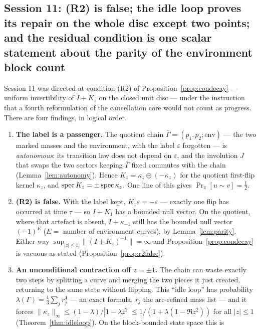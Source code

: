\subsection{Session 11: (R2) is false; the idle loop proves its repair
on the whole disc except two points; and the residual condition is one
scalar statement about the parity of the environment block
count}\label{sec:s11}

Session 11 was directed at condition (R2) of
Proposition~\ref{prop:condecay} --- uniform invertibility of $I+K_z$ on
the closed unit disc --- under the instruction that a fourth
reformulation of the cancellation core would not count as progress.
There are four findings, in logical order.

\begin{enumerate}[leftmargin=2.2em]
\item[(1)] \textbf{The label is a passenger.}  The quotient chain
$\bar\Gamma=(p_1,p_2;\mathrm{env})$ --- the two marked masses and the
environment, with the label $\varepsilon$ forgotten --- is
\emph{autonomous}: its transition law does not depend on
$\varepsilon$, and the involution $J$ that swaps the two sectors
keeping $\bar\Gamma$ fixed commutes with the chain
(Lemma~\ref{lem:autonomy}).  Hence $K_z=\kappa_z\oplus(-\kappa_z)$ for
the quotient first-flip kernel $\kappa_z$, and
$\operatorname{spec} K_z=\pm\operatorname{spec}\kappa_z$.  One line of this gives
$\Pr_\pi[u\sim v]=\tfrac12$.
\item[(2)] \textbf{(R2) is false.}  With the label kept,
$K_1\varepsilon=-\varepsilon$ --- exactly one flip has occurred at
time $\tau$ --- so $I+K_1$ has a bounded null vector.  On the quotient,
where that artefact is absent, $I+\kappa_{-1}$ still has the bounded
null vector $(-1)^{E}$ ($E=$ number of environment curves), by
Lemma~\ref{lem:parity}.  Either way
$\sup_{|z|\le1}\|(I+K_z)^{-1}\|=\infty$ and
Proposition~\ref{prop:condecay} is vacuous as stated
(Proposition~\ref{prop:r2false}).
\item[(3)] \textbf{An unconditional contraction off $z=\pm1$.}  The
chain can waste exactly two steps by splitting a curve and merging the
two pieces it just created, returning to the same state without
flipping.  This ``idle loop'' has probability
$\lambda(\Gamma)=\tfrac13\sum_jr_j^4$ --- an exact formula, $r_j$ the
arc-refined mass list --- and it forces
$\|\kappa_z\|_\infty\le(1-\lambda)/|1-\lambda z^2|
\le1/(1+\lambda(1-\Re z^2))$ for all $|z|\le1$
(Theorem~\ref{thm:idleloop}).  On the block-bounded state space this is

\end{enumerate}
